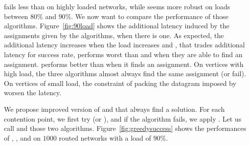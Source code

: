 \documentclass[english]{article}
\begin{document}
 \greedydeadline fails less than \greedynormalized on highly loaded networks, while \greedynormalized seems more robust on loads between $80\%$ and $90\%$. We now want to compare the performance of those algorithms. Figure~\ref{fig:90load} shows the additional latency induced by the assignments given by the algorithms, when there is one. As expected, the additional latency increases when the load increases and \greedypacked, that trades additional latency for success rate, performs worst than \greedydeadline and \greedynormalized when they are able to find an assignment.
\greedynormalized performs better than \greedydeadline when it finds an assignment.  On vertices with high load,
 the three algorithms almost always find the same assignment (or fail). On vertices of small load, the constraint of packing the datagram imposed by \greedydeadline worsen the latency.

We propose improved version of \greedydeadline and \greedynormalized that always find a solution. For each contention point, we first try \greedydeadline (or \greedynormalized), 
and if the algorithm fails, we apply \greedypacked. Let us call \hybridgreedydeadline and \hybridgreedynormalized those two algorithms. Figure~\ref{fig:greedysuccess} shows the performances of \hybridgreedydeadline, \hybridgreedynormalized, and \greedypacked on $1000$ routed networks with a load of $90\%$.
\end{document}
